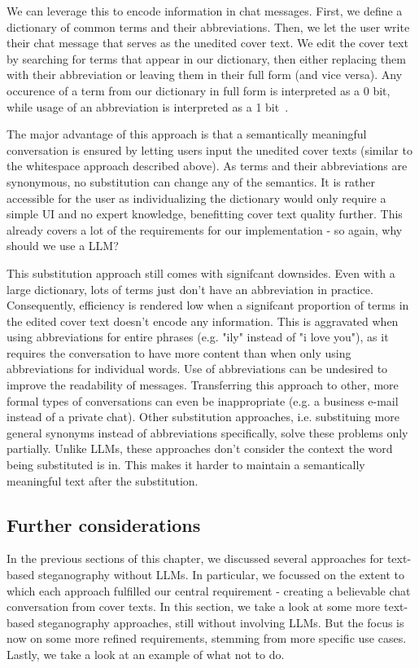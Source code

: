 We can leverage this to encode information in chat messages. First, we define a dictionary of common terms and their abbreviations. Then, we let the user write their chat message that serves as the unedited cover text. We edit the cover text by searching for terms that appear in our dictionary, then either replacing them with their abbreviation or leaving them in their full form (and vice versa). Any occurence of a term from our dictionary in full form is interpreted as a 0 bit, while usage of an abbreviation is interpreted as a 1 bit~\cite{shirali-shahrezaTextSteganographySMS2007}.

The major advantage of this approach is that a semantically meaningful conversation is ensured by letting users input the unedited cover texts (similar to the whitespace approach described above). As terms and their abbreviations are synonymous, no substitution can change any of the semantics. It is rather accessible for the user as individualizing the dictionary would only require a simple \gls{UI} and no expert knowledge, benefitting cover text quality further. This already covers a lot of the requirements for our implementation - so again, why should we use a \gls{LLM}?

This substitution approach still comes with signifcant downsides. Even with a large dictionary, lots of terms just don't have an abbreviation in practice. Consequently, efficiency is rendered low when a signifcant proportion of terms in the edited cover text doesn't encode any information. This is aggravated when using abbreviations for entire phrases (e.g. "ily" instead of "i love you"), as it requires the conversation to have more content than when only using abbreviations for individual words. Use of abbreviations can be undesired to improve the readability of messages. Transferring this approach to other, more formal types of conversations can even be inappropriate (e.g. a business e-mail instead of a private chat). Other substitution approaches, i.e. substituing more general synonyms instead of abbreviations specifically, solve these problems only partially. Unlike \glspl{LLM}, these approaches don't consider the context the word being substituted is in. This makes it harder to maintain a semantically meaningful text after the substitution.

\subsection{Further considerations}
\label{sec:furtherConsiderations}
In the previous sections of this chapter, we discussed several approaches for text-based steganography without \glspl{LLM}. In particular, we focussed on the extent to which each approach fulfilled our central requirement - creating a believable chat conversation from cover texts. In this section, we take a look at some more text-based steganography approaches, still without involving \glspl{LLM}. But the focus is now on some more refined requirements, stemming from more specific use cases. Lastly, we take a look at an example of what not to do.

